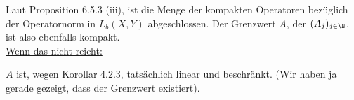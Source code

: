 \begin{solution}
Laut Proposition 6.5.3 (iii), ist die Menge der kompakten Operatoren bezüglich der Operatornorm in $L_b(X, Y)$ abgeschlossen.
Der Grenzwert $A$, der $(A_j)_{j \in \N}$, ist also ebenfalls kompakt. \\

\underline{Wenn das nicht reicht:} \\


$A$ ist, wegen Korollar 4.2.3, tatsächlich linear und beschränkt.
(Wir haben ja gerade gezeigt, dass der Grenzwert existiert).

\end{solution}
